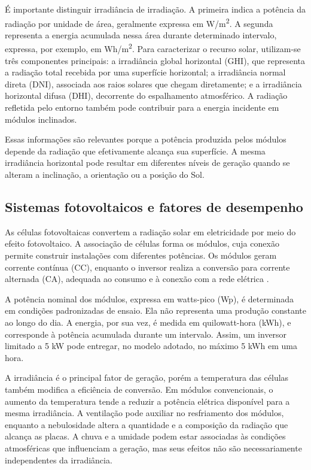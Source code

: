 É importante distinguir irradiância de irradiação. A primeira indica a potência da radiação por unidade de área, geralmente expressa em W/m\textsuperscript{2}. A segunda representa a energia acumulada nessa área durante determinado intervalo, expressa, por exemplo, em Wh/m\textsuperscript{2}. Para caracterizar o recurso solar, utilizam-se três componentes principais: a irradiância global horizontal (GHI), que representa a radiação total recebida por uma superfície horizontal; a irradiância normal direta (DNI), associada aos raios solares que chegam diretamente; e a irradiância horizontal difusa (DHI), decorrente do espalhamento atmosférico. A radiação refletida pelo entorno também pode contribuir para a energia incidente em módulos inclinados.

Essas informações são relevantes porque a potência produzida pelos módulos depende da radiação que efetivamente alcança sua superfície. A mesma irradiância horizontal pode resultar em diferentes níveis de geração quando se alteram a inclinação, a orientação ou a posição do Sol.

\subsection{Sistemas fotovoltaicos e fatores de desempenho}
As células fotovoltaicas convertem a radiação solar em eletricidade por meio do efeito fotovoltaico. A associação de células forma os módulos, cuja conexão permite construir instalações com diferentes potências. Os módulos geram corrente contínua (CC), enquanto o inversor realiza a conversão para corrente alternada (CA), adequada ao consumo e à conexão com a rede elétrica \cite{correa}.

A potência nominal dos módulos, expressa em watts-pico (Wp), é determinada em condições padronizadas de ensaio. Ela não representa uma produção constante ao longo do dia. A energia, por sua vez, é medida em quilowatt-hora (kWh), e corresponde à potência acumulada durante um intervalo. Assim, um inversor limitado a 5 kW pode entregar, no modelo adotado, no máximo 5 kWh em uma hora.

A irradiância é o principal fator de geração, porém a temperatura das células também modifica a eficiência de conversão. Em módulos convencionais, o aumento da temperatura tende a reduzir a potência elétrica disponível para a mesma irradiância. A ventilação pode auxiliar no resfriamento dos módulos, enquanto a nebulosidade altera a quantidade e a composição da radiação que alcança as placas. A chuva e a umidade podem estar associadas às condições atmosféricas que influenciam a geração, mas seus efeitos não são necessariamente independentes da irradiância.

